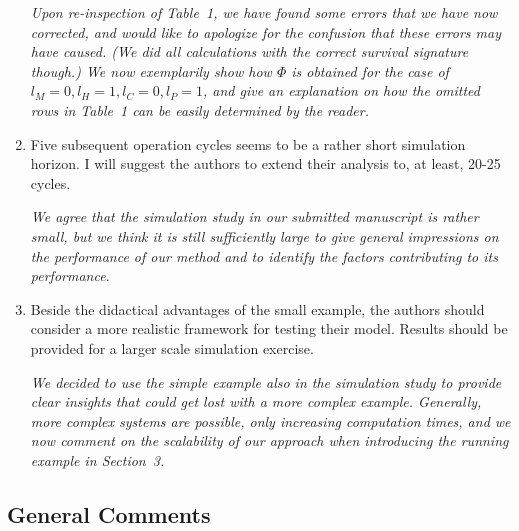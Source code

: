 \documentclass[authoryear]{elsarticle}
\begin{document}
\begin{enumerate}
\emph{Upon re-inspection of Table~1, we have found some errors that we have now corrected,
and would like to apologize for the confusion that these errors may have caused.
(We did all calculations with the correct survival signature though.)
We now exemplarily show how $\Phi$ is obtained for the case of $l_M = 0, l_H = 1, l_C = 0, l_P = 1$,
and give an explanation on how the omitted rows in Table~1 can be easily determined by the reader.}

\item Five subsequent operation cycles seems to be a rather short simulation horizon. I will suggest the authors to extend their analysis to, at least, 20-25 cycles.

\smallskip

\emph{We agree that the simulation study in our submitted manuscript is rather small,
but we think it is still sufficiently large to give general impressions on the performance of our method
and to identify the factors contributing to its performance.}

\item Beside the didactical advantages of the small example, the authors should consider a more realistic framework for testing their model. Results should be provided for a larger scale simulation exercise.

\smallskip

\emph{We decided to use the simple example also in the simulation study to provide clear insights
that could get lost with a more complex example.
Generally, more complex systems are possible, only increasing computation times,
and we now comment on the scalability of our approach when introducing the running example in Section~3.}
\end{enumerate}


\subsection*{General Comments}
\end{document}
